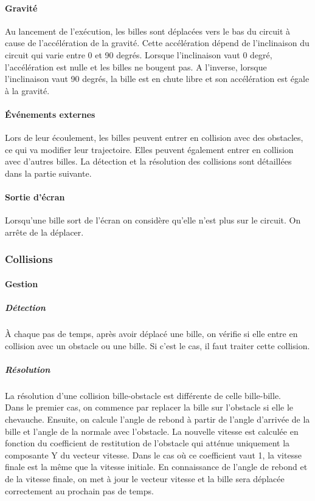 \documentclass{report}
\begin{document}
\paragraph{Gravité}

Au lancement de l’exécution, les billes sont déplacées vers le bas du circuit à cause de l’accélération de la gravité. Cette accélération dépend de l’inclinaison du circuit qui varie entre 0 et 90 degrés. Lorsque l’inclinaison vaut 0 degré, l’accélération est nulle et les billes ne bougent pas. A l’inverse, lorsque l’inclinaison vaut 90 degrés, la bille est en chute libre et son accélération est égale à la gravité.

\paragraph{Événements externes}

Lors de leur écoulement, les billes peuvent entrer en collision avec des obstacles, ce qui va modifier leur trajectoire. Elles peuvent également entrer en collision avec d’autres billes. La détection et la résolution des collisions sont détaillées dans la partie suivante.

\paragraph{Sortie d'écran}

Lorsqu’une bille sort de l’écran on considère qu’elle n’est plus sur le circuit. On arrête de la déplacer.

\subsubsection{Collisions}

\paragraph{Gestion}

\subparagraph{Détection}

À chaque pas de temps, après avoir déplacé une bille, on vérifie si elle entre en collision avec un obstacle ou une bille. Si c’est le cas, il faut traiter cette collision.

\subparagraph{Résolution}

La résolution d’une collision bille-obstacle est différente de celle bille-bille. \\

Dans le premier cas, on commence par replacer la bille sur l’obstacle si elle le chevauche. Ensuite, on calcule l’angle de rebond à partir de l’angle d’arrivée de la bille et l’angle de la normale avec l’obstacle. La nouvelle vitesse est calculée en fonction du coefficient de restitution de l’obstacle qui atténue uniquement la composante Y du vecteur vitesse. Dans le cas où ce coefficient vaut 1, la vitesse finale est la même que la vitesse initiale. En connaissance de l’angle de rebond et de la vitesse finale,  on met à jour le vecteur vitesse et la bille sera déplacée correctement au prochain pas de temps. \\
\end{document}
